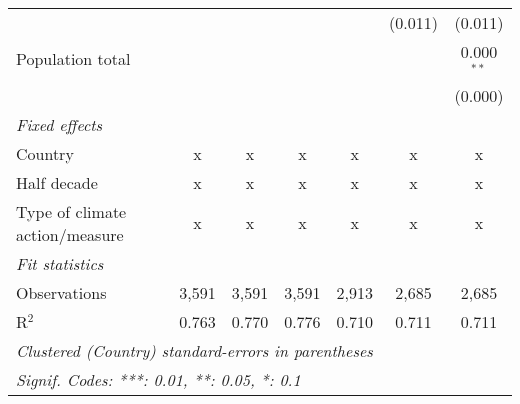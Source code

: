 \begin{tabular}{lcccccc}
                                                                           &             &               &               &                & (0.011)        & (0.011)\\   
   Population total                                                        &             &               &               &                &                & 0.000$^{**}$\\   
                                                                           &             &               &               &                &                & (0.000)\\   
   \emph{Fixed effects}\\
   Country                                                                 & x           & x             & x             & x              & x              & x\\  
   Half decade                                                             & x           & x             & x             & x              & x              & x\\  
   Type of climate action/measure                                          & x           & x             & x             & x              & x              & x\\  
   \midrule \emph{Fit statistics}\\
   Observations                                                            & 3,591       & 3,591         & 3,591         & 2,913          & 2,685          & 2,685\\  
   R$^2$                                                                   & 0.763       & 0.770         & 0.776         & 0.710          & 0.711          & 0.711\\  
   \midrule
   \multicolumn{7}{l}{\emph{Clustered (Country) standard-errors in parentheses}}\\
   \multicolumn{7}{l}{\emph{Signif. Codes: ***: 0.01, **: 0.05, *: 0.1}}\\
\end{tabular}
\par\endgroup


